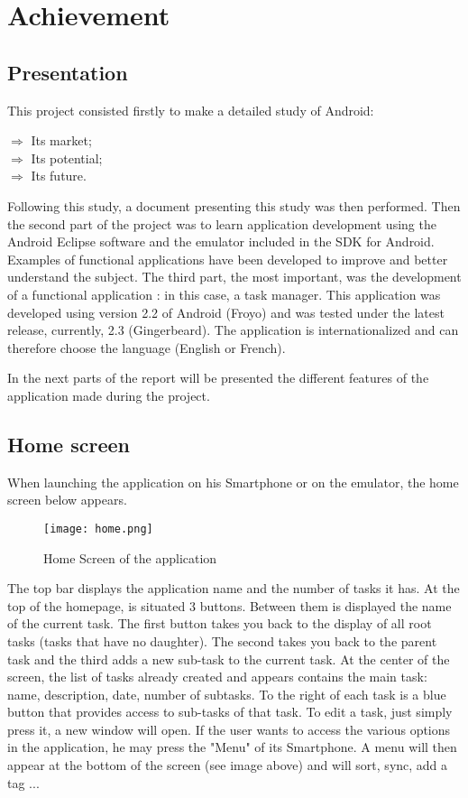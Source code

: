 \chapter{Achievement}

\section{Presentation}

This project consisted firstly to make a detailed study of Android:
\begin{description}
    \item[$\Rightarrow$ Its market;]
    \item[$\Rightarrow$ Its potential;]
    \item[$\Rightarrow$ Its future.]
\end{description}

\noindent Following this study, a document presenting this study was then performed.
Then the second part of the project was to learn application development using the Android Eclipse software and the emulator included in the SDK for Android.
Examples of functional applications have been developed to improve and better understand the subject.
The third part, the most important, was the development of a functional application : in this case, a task manager. This application was developed using version 2.2 of Android (Froyo) and was tested under the latest release, currently, 2.3 (Gingerbeard). The application is internationalized and can therefore choose the language (English or French).

\noindent In the next parts of the report will be presented the different features of the application made during the project.

\section{Home screen}

When launching the application on his Smartphone or on the emulator, the home screen below appears.

\begin{figure}[!ht]
    \centering
    \texttt{[image: home.png]}
    \caption{Home Screen of the application}
\end{figure}

\noindent The top bar displays the application name and the number of tasks it has.
At the top of the homepage, is situated 3 buttons. Between them is displayed the name of the current task. The first button takes you back to the display of all root tasks (tasks that have no daughter). The second takes you back to the parent task and the third adds a new sub-task to the current task.
At the center of the screen, the list of tasks already created and appears contains the main task: name, description, date, number of subtasks. To the right of each task is a blue button that provides access to sub-tasks of that task. To edit a task, just simply press it, a new window will open.
If the user wants to access the various options in the application, he may press the "Menu" of its Smartphone. A menu will then appear at the bottom of the screen (see image above) and will sort, sync, add a tag ...

